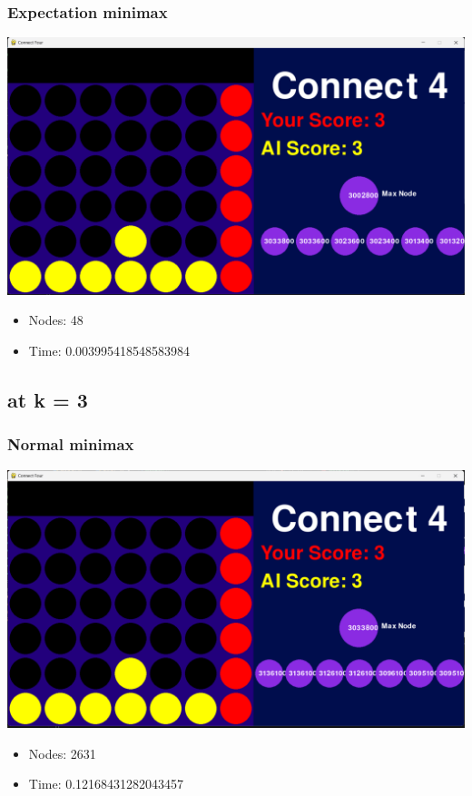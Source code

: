 \documentclass{article}
\begin{document}
\subsubsection*{Expectation minimax}
\begin{center}
    \includegraphics[width=0.8\linewidth]{testcase.png}
\end{center}
\begin{itemize}
    \item Nodes: 48
    \item Time: 0.003995418548583984
\end{itemize}
\subsection*{at k = 3}
\subsubsection*{Normal minimax}
\begin{center}
    \includegraphics[width=0.8\linewidth]{testcase3.png}
\end{center}
\begin{itemize}
    \item Nodes: 2631
    \item Time: 0.12168431282043457
\end{itemize}
\end{document}
